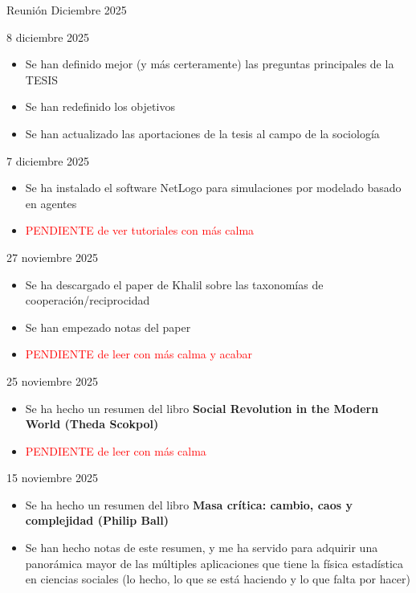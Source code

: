 \documentclass[a4paper,11pt]{article}
\begin{document}
    \begin{seccionbox}[violetasuave]{Reunión Diciembre 2025}
        \begin{updateo}{8 diciembre 2025}
            \begin{itemize}
                \item Se han definido mejor (y más certeramente) las preguntas principales de la TESIS
                \item Se han redefinido los objetivos
                \item Se han actualizado las aportaciones de la tesis al campo de la sociología
            \end{itemize}
        \end{updateo}
        \begin{updateo}{7 diciembre 2025}
            \begin{itemize}
                \item Se ha instalado el software NetLogo para simulaciones por modelado basado en agentes
                \item \textcolor{red}{PENDIENTE de ver tutoriales con más calma}
            \end{itemize}
        \end{updateo}
        \begin{updateo}{27 noviembre 2025}
            \begin{itemize}
                \item Se ha descargado el paper de Khalil sobre las taxonomías de cooperación/reciprocidad
                \item Se han empezado notas del paper
                \item \textcolor{red}{PENDIENTE de leer con más calma y acabar}
            \end{itemize}
        \end{updateo}
        \begin{updateo}{25 noviembre 2025}
            \begin{itemize}
                \item Se ha hecho un resumen del libro \textbf{Social Revolution in the Modern World (Theda Scokpol)}
                \item \textcolor{red}{PENDIENTE de leer con más calma}
            \end{itemize}
        \end{updateo}
        \begin{updateo}{15 noviembre 2025}
            \begin{itemize}
                \item Se ha hecho un resumen del libro \textbf{Masa crítica: cambio, caos y complejidad (Philip Ball)}
                \item Se han hecho notas de este resumen, y me ha servido para adquirir una panorámica mayor de las múltiples aplicaciones que tiene la física estadística en ciencias sociales (lo hecho, lo que se está haciendo y lo que falta por hacer)
            \end{itemize} 
        \end{updateo}
    \end{seccionbox}
\end{document}
